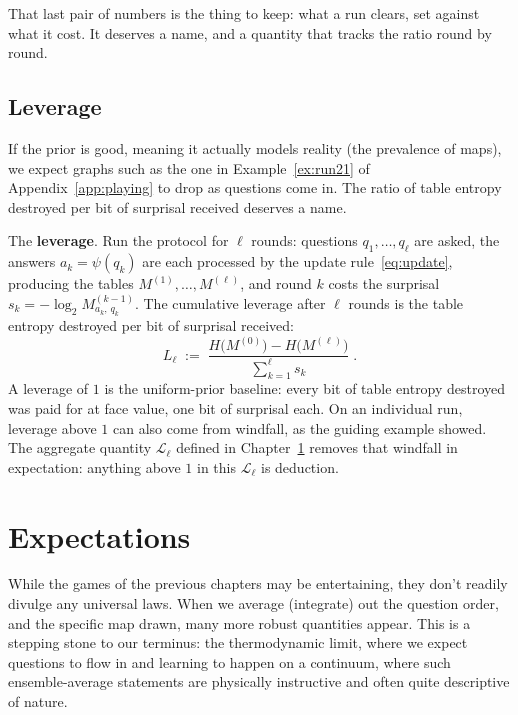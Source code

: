 \documentclass[11pt]{article}
\let\stdsection\section
\renewcommand{\section}{\clearpage\stdsection}
\begin{document}
That last pair of numbers is the thing to keep: what a run clears,
set against what it cost. It deserves a name, and a quantity that
tracks the ratio round by round.

\subsection{Leverage}

If the prior is good, meaning it actually models reality (the prevalence of maps),
we expect graphs such as the one in Example~\ref{ex:run21} of
Appendix~\ref{app:playing} to drop as questions come in.
The ratio of table entropy destroyed per bit of
surprisal received deserves a name.

The \textbf{leverage}. Run the protocol for $\ell$ rounds:
questions $q_1, \ldots, q_\ell$ are asked, the answers
$a_k = \psi(q_k)$ are each processed by the update
rule~\eqref{eq:update}, producing the tables
$M^{(1)}, \ldots, M^{(\ell)}$, and round $k$
costs the surprisal $s_k = -\log_2 M^{(k-1)}_{a_k,\,q_k}$. The
cumulative leverage after $\ell$ rounds is the table entropy destroyed
per bit of surprisal received:
\begin{equation}\label{eq:leverage}
  L_\ell \;:=\;
  \frac{H\big(M^{(0)}\big) - H\big(M^{(\ell)}\big)}
       {\sum_{k=1}^{\ell} s_k}\;.
\end{equation}
A leverage of $1$ is the uniform-prior baseline: every bit of table
entropy destroyed was paid for at face value, one bit of surprisal
each. On an individual run, leverage above $1$ can also come from
windfall, as the guiding example showed. The aggregate quantity
$\mathcal L_\ell$ defined in Chapter~\ref{sec:expectations} removes
that windfall in expectation: anything above $1$ in this
$\mathcal L_\ell$ is deduction.

\section{Expectations}\label{sec:expectations}

While the games of the previous chapters may be entertaining, they don't readily divulge any universal laws. When we average (integrate) out the question order, and the specific map drawn,
many more robust quantities appear. This is a stepping stone to our terminus: the thermodynamic limit, where we expect questions to flow in and learning to happen on a continuum, where such ensemble-average statements are
physically instructive and often quite descriptive of nature.
\end{document}

